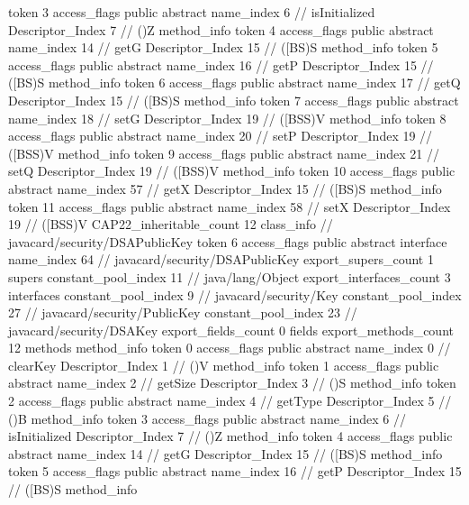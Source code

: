 {{{{{					token	3
					access_flags	public abstract
					name_index	6		// isInitialized
					Descriptor_Index	7		// ()Z
				}
				method_info {
					token	4
					access_flags	public abstract
					name_index	14		// getG
					Descriptor_Index	15		// ([BS)S
				}
				method_info {
					token	5
					access_flags	public abstract
					name_index	16		// getP
					Descriptor_Index	15		// ([BS)S
				}
				method_info {
					token	6
					access_flags	public abstract
					name_index	17		// getQ
					Descriptor_Index	15		// ([BS)S
				}
				method_info {
					token	7
					access_flags	public abstract
					name_index	18		// setG
					Descriptor_Index	19		// ([BSS)V
				}
				method_info {
					token	8
					access_flags	public abstract
					name_index	20		// setP
					Descriptor_Index	19		// ([BSS)V
				}
				method_info {
					token	9
					access_flags	public abstract
					name_index	21		// setQ
					Descriptor_Index	19		// ([BSS)V
				}
				method_info {
					token	10
					access_flags	public abstract
					name_index	57		// getX
					Descriptor_Index	15		// ([BS)S
				}
				method_info {
					token	11
					access_flags	public abstract
					name_index	58		// setX
					Descriptor_Index	19		// ([BSS)V
				}
			}
			CAP22_inheritable_count	12
		}
		class_info {		// javacard/security/DSAPublicKey
			token	6
			access_flags	public abstract interface
			name_index	64		// javacard/security/DSAPublicKey
			export_supers_count	1
			supers {
				constant_pool_index	11		// java/lang/Object
			}
			export_interfaces_count	3
			interfaces {
				constant_pool_index	9		// javacard/security/Key
				constant_pool_index	27		// javacard/security/PublicKey
				constant_pool_index	23		// javacard/security/DSAKey
			}
			export_fields_count	0
			fields {
			}
			export_methods_count	12
			methods {
				method_info {
					token	0
					access_flags	public abstract
					name_index	0		// clearKey
					Descriptor_Index	1		// ()V
				}
				method_info {
					token	1
					access_flags	public abstract
					name_index	2		// getSize
					Descriptor_Index	3		// ()S
				}
				method_info {
					token	2
					access_flags	public abstract
					name_index	4		// getType
					Descriptor_Index	5		// ()B
				}
				method_info {
					token	3
					access_flags	public abstract
					name_index	6		// isInitialized
					Descriptor_Index	7		// ()Z
				}
				method_info {
					token	4
					access_flags	public abstract
					name_index	14		// getG
					Descriptor_Index	15		// ([BS)S
				}
				method_info {
					token	5
					access_flags	public abstract
					name_index	16		// getP
					Descriptor_Index	15		// ([BS)S
				}
				method_info {
}}}}}
